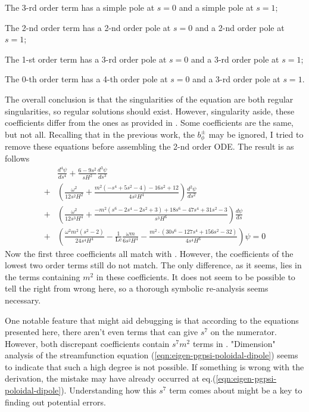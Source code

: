 The 3-rd order term has a simple pole at $s=0$ and a simple pole at $s=1$;

The 2-nd order term has a 2-nd order pole at $s=0$ and a 2-nd order pole at $s=1$;

The 1-st order term has a 3-rd order pole at $s=0$ and a 3-rd order pole at $s=1$;

The 0-th order term has a 4-th order pole at $s=0$ and a 3-rd order pole at $s=1$.

The overall conclusion is that the singularities of the equation are both regular singularities, so regular solutions should exist.
However, singularity aside, these coefficients differ from the ones as provided in \textcite{holdenried-chernoff_long_2021}. Some coefficients are the same, but not all. Recalling that in the previous work, the $b_\phi^{\pm}$ may be ignored, I tried to remove these equations before assembling the 2-nd order ODE. The result is as follows
\begin{equation}
\begin{aligned}
    &\frac{d^{4}\psi}{d s^{4}} + \frac{6 - 9 s^{2}}{sH^{2}} \frac{d^{3}\psi}{d s^{3}} \\
    +& \left(\frac{\omega^{2}}{12 s^{2} H^{2}} + \frac{m^{2} \left(- s^{4} + 5 s^{2} - 4\right) - 16 s^{2} + 12}{4 s^{2} H^{4}}\right) \frac{d^{2}\psi}{d s^{2}} \\
    +& \left(\frac{\omega^{2}}{12 s^{3} H^{4}} + \frac{- m^{2} \left(s^{6} - 2 s^{4} - 2 s^{2} + 3\right) + 18 s^{6} - 47 s^{4} + 31 s^{2} - 3}{s^{3} H^{6}}\right) \frac{d\psi}{d s} \\
    +& \left(\frac{\omega^{2} m^{2} \left(s^2 - 2\right)}{24 s^{4} H^{4}} - \frac{1}{\mathrm{Le}} \frac{\omega m}{6 s^{2} H^{4}} - \frac{m^{2} \cdot \left(30 s^{6} - 127 s^{4} + 156 s^{2} - 32\right)}{4 s^{4} H^{6}}\right) \psi = 0
\end{aligned}
\end{equation}
Now the first three coefficients all match with \textcite{holdenried-chernoff_long_2021}. However, the coefficients of the lowest two order terms still do not match. The only difference, as it seems, lies in the terms containing $m^2$ in these coefficients.
It does not seem to be possible to tell the right from wrong here, so a thorough symbolic re-analysis seems necessary.

One notable feature that might aid debugging is that according to the equations presented here, there aren't even terms that can give $s^7$ on the numerator. However, both discrepant coefficients contain $s^7m^2$ terms in \textcite{holdenried-chernoff_long_2021}. "Dimension" analysis of the streamfunction equation (\ref{eqn:eigen-pgpsi-poloidal-dipole}) seems to indicate that such a high degree is not possible. If something is wrong with the derivation, the mistake may have already occurred at eq.(\ref{eqn:eigen-pgpsi-poloidal-dipole}). Understanding how this $s^7$ term comes about might be a key to finding out potential errors.



